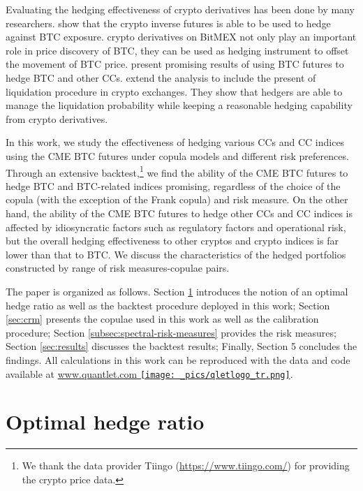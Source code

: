 \documentclass[11pt,a4paper,english]{article}
\begin{document}
Evaluating the hedging effectiveness of crypto derivatives has been done by many researchers. 
\citet{deng2020minimum} show that the crypto inverse futures is able to be used to hedge against BTC exposure.
\citet{alexander2020bitmex} crypto derivatives on BitMEX not only play an important role in price discovery of BTC,
 they can be used as hedging instrument to offset the movement of BTC price. 
\citet{sebastiao2020bitcoin} present promising results of using BTC futures to hedge BTC and other CCs. 
\citet{alexander2021hedging} extend the analysis to include the present of liquidation procedure in crypto exchanges. 
They show that hedgers are able to manage the liquidation probability while keeping a reasonable hedging capability from crypto derivatives. 

In this work, we study the effectiveness of hedging various CCs and
CC indices using the CME BTC futures under copula models and different
risk preferences. 
Through an extensive backtest,\footnote{We thank the data provider
  Tiingo (\href{https://www.tiingo.com/}{https://www.tiingo.com/}) for
  providing the crypto price data.}
 we find the ability of the CME BTC futures to hedge BTC and BTC-related
 indices promising, regardless of the choice of the copula (with the
 exception of the Frank copula) and risk measure. 
On the other hand, the ability of the CME BTC futures to hedge other CCs and CC indices
is affected by idiosyncratic factors such as regulatory factors and operational risk,
but the overall hedging effectiveness to other cryptos and crypto indices is far lower
than that to BTC.
We discuss the characteristics of the hedged portfolios constructed by range of risk measures-copulae pairs.

The paper is organized as follows. Section \ref{sec:optimal-hedge-ratio} introduces the notion of
an optimal hedge ratio as well as the backtest procedure deployed in this work;
Section \ref{sec:crm} presents the copulae used in this work as well as the calibration procedure;
Section \ref{subsec:spectral-risk-measures} provides the risk measures;
Section \ref{sec:results} discusses the backtest results; Finally,
Section 5 concludes the findings. 
All calculations in this work can be reproduced with the data and code
available at \href{http://www.quantlet.com/}{www.quantlet.com
  {\texttt{[image: \_pics/qletlogo\_tr.png]}}}. 

\section{Optimal hedge ratio}\label{sec:optimal-hedge-ratio}
\end{document}
